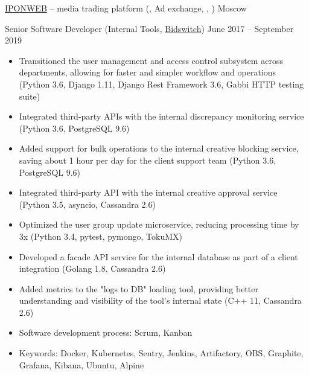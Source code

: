 \documentclass[unicode, 10pt, a4paper, oneside, fleqn]{article}
\begin{document}
\job  %
    {\href{https://www.criteo.com/news/press-releases/2021/12/criteo-enters-into-exclusive-negotiations-to-acquire-iponweb/}{IPONWEB} -- media trading platform
     (, Ad exchange, , )}
    {Moscow}
    {
        \position  %
        {Senior Software Developer (Internal Tools, \href{http://www.bidswitch.com/}{Bidswitch})}
        {June 2017 -- September 2019}
        {
            \begin{itemize}
                \item{Transitioned the user management and access control
                    subsystem across departments, allowing for faster and
                simpler workflow and operations (Python 3.6, Django 1.11, Django
            Rest Framework 3.6, Gabbi HTTP testing suite)}
                \item{Integrated third-party APIs with the internal discrepancy
                    monitoring service (Python 3.6, PostgreSQL 9.6)}
                \item{Added support for bulk operations to the internal creative
                    blocking service, saving about 1 hour per day for the client
                support team (Python 3.6, PostgreSQL 9.6)}
                \item{Integrated third-party API with the internal creative
                    approval service (Python 3.5, asyncio, Cassandra 2.6)}
                \item{Optimized the user group update microservice, reducing
                    processing time by 3x (Python 3.4, pytest, pymongo, TokuMX)}
                \item{Developed a facade API service for the internal database
                    as part of a client integration (Golang 1.8, Cassandra 2.6)}
                \item{Added metrics to the "logs to DB" loading tool, providing
                    better understanding and visibility of the tool's internal
                state (C++ 11, Cassandra 2.6)}
                \item{Software development process: Scrum, Kanban}
                \item{Keywords: Docker, Kubernetes, Sentry, Jenkins,
                    Artifactory, OBS, Graphite, Grafana, Kibana, Ubuntu, Alpine}
            \end{itemize}
        }
        \position  %
}
\end{document}
